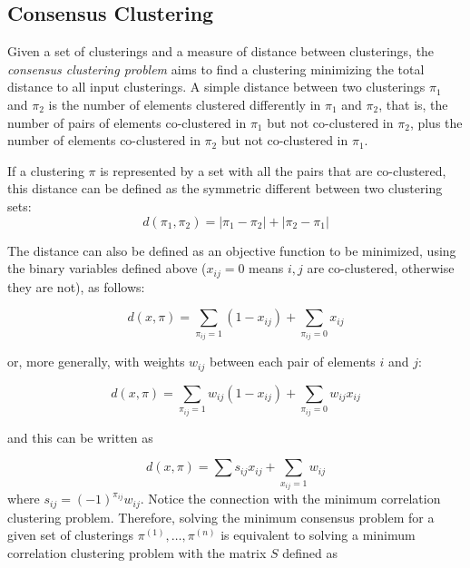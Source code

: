 \documentclass[a4paper,UKenglish]{lipics-v2016}
\begin{document}
\subsection{Consensus Clustering}

Given a set of clusterings and a measure of distance between clusterings, the
\emph{consensus clustering problem} aims to find a  clustering minimizing the total
distance to all input clusterings. A simple distance between two clusterings
$\pi_1$ and $\pi_2$  is the number of elements clustered differently in
$\pi_1$ and $\pi_2$, that is, the number of pairs of elements co-clustered  in
$\pi_1$ but not co-clustered in $\pi_2$, plus the number of elements  co-clustered 
in $\pi_2$ but not co-clustered in $\pi_1$.

If a clustering $\pi$ is represented by a set with all the pairs that are co-clustered, this distance 
can be defined as the symmetric different between two clustering sets:
\begin{equation}
	d(\pi_1,\pi_2) = | \pi_1 - \pi_2 | + | \pi_2 - \pi_1 | 
\end{equation}


The distance can also be defined as an objective function to be minimized, using the binary variables defined 
above ($x_{ij} = 0$ means $i,j$ are co-clustered, otherwise they are not), as follows:

\begin{equation}
\label{eq:sum_d}
d(x,\pi) = \sum_{\pi_{ij} = 1} (1 - x_{ij}) + \sum_{\pi_{ij} = 0} x_{ij}
\end{equation}

or, more generally, with weights $w_{ij}$ between each pair of elements $i$ and $j$:

\begin{equation}
\label{eq:w_dist}
d(x,\pi) = \sum_{\pi_{ij} = 1} w_{ij} (1 - x_{ij}) + \sum_{\pi_{ij} = 0} w_{ij} x_{ij}
\end{equation}

and this can be written as 

\begin{equation}
d(x,\pi) = \sum s_{ij} x_{ij} + \sum_{x_{ij}=1} w_{ij}
\end{equation}
where $s_{ij} = (-1)^{\pi_{ij}}w_{ij}$. Notice the connection with the minimum correlation clustering problem. Therefore, 
solving the minimum consensus problem for a given set of clusterings $\pi^{(1)},\dots, \pi^{(n)}$ is equivalent to solving 
a minimum correlation clustering problem with the matrix $S$ defined as 
\end{document}
